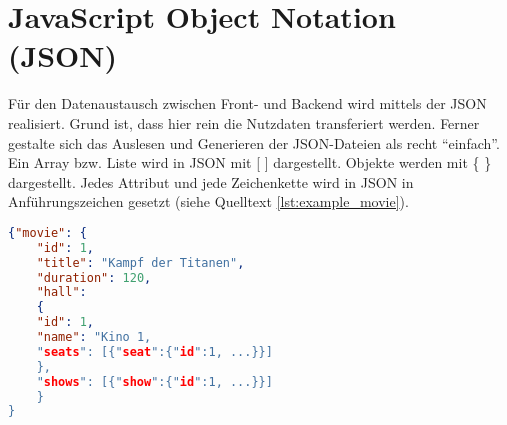 \section{JavaScript Object Notation (JSON)}
\label{sec:json}
Für den Datenaustausch zwischen Front- und Backend wird mittels der \ac{JSON} realisiert. Grund ist, dass hier rein die Nutzdaten transferiert werden. Ferner gestalte sich das Auslesen und Generieren der \ac{JSON}-Dateien als recht \enquote{einfach}. \\
Ein Array bzw. Liste wird in \ac{JSON} mit [ ] dargestellt. Objekte werden mit \{ \} dargestellt. Jedes Attribut und jede Zeichenkette wird in \ac{JSON} in Anführungszeichen gesetzt (siehe Quelltext \vref{lst:example_movie}).  

\begin{minipage}{\linewidth}
\begin{lstlisting}[language=json,firstnumber=1]
{"movie": {
	"id": 1,
	"title": "Kampf der Titanen",
	"duration": 120,
	"hall":
	{
	"id": 1,
	"name": "Kino 1,
	"seats": [{"seat":{"id":1, ...}}]
	}, 
	"shows": [{"show":{"id":1, ...}}]
	}
}
\end{lstlisting}
\label{lst:example_movie}
\end{minipage}
